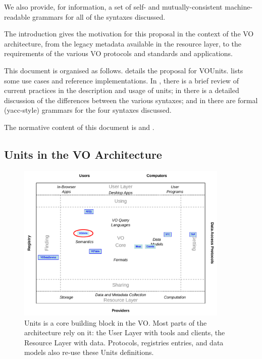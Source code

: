 \documentclass[11pt,a4paper]{ivoa}
\begin{document}
We also provide, for information, a set of self- and mutually-consistent
machine-readable grammars for all of the syntaxes discussed.

The introduction gives the motivation for
this proposal in the context of the VO architecture, from the legacy 
metadata available in the resource layer, to the requirements of the various 
VO protocols and standards and applications.

This document is organised as follows. 
details the proposal for VOUnits.  lists some
use cases and reference implementations.  In ,
there is a brief review of current practices in the description and
usage of units; in  there is a detailed
discussion of the differences between the various syntaxes; and
in  there are formal (yacc-style) grammars for
the four syntaxes discussed.

The normative content of this document is  and .

\subsection{Units in the VO Architecture}

\renewcommand{\topfraction}{.85}
\renewcommand{\bottomfraction}{.7}
\renewcommand{\textfraction}{.15}
\renewcommand{\floatpagefraction}{.66}

\begin{figure}
\centering

\includegraphics[width=0.9\textwidth]{role_diagram.pdf}
  \caption{Units is a core building block in the VO.  Most parts of the
  architecture rely on it: the User Layer with tools and clients, the
  Resource Layer with data.  Protocols, registries entries, and
  data models also re-use these Units definitions.}
  \label{fig:architecture}
\end{figure}
\end{document}
